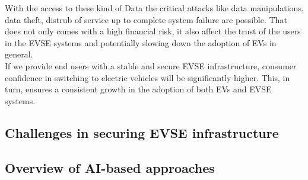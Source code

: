 With the access to these kind of Data the critical attacks like data manipulations, data theft, distrub of service up to complete system failure are possible\cite{nature2025}. That does not only comes with a high financial risk, it also affect the trust of the users in the EVSE systems and potentially slowing down the adoption of EVs in general.\\
If we provide end users with a stable and secure EVSE infrastructure, consumer confidence in switching to electric vehicles will be significantly higher. This, in turn, ensures a consistent growth in the adoption of both EVs and EVSE systems.


\subsection{Challenges in securing EVSE infrastructure}

\subsection{Overview of AI-based approaches}

